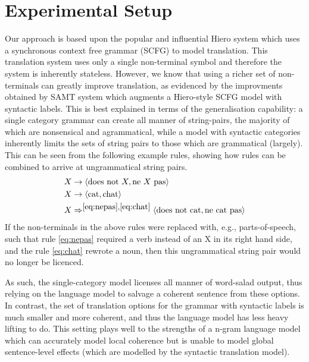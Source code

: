 \chapter{Experimental Setup}

Our approach is based upon the popular and influential Hiero system \cite{chiang07} which uses a synchronous context free grammar (SCFG) to model translation. 
This translation system uses only a single non-terminal symbol and therefore the system is inherently stateless. 
However, we know that using a richer set of non-terminals can greatly improve translation, as evidenced by the improvments obtained by SAMT system \cite{samt} which augments a Hiero-style SCFG model with syntactic labels.
This is best explained in terms of the generalisation capability: a single category grammar can create all manner of string-pairs, the majority of which are nonsensical and agrammatical, while a model with syntactic categories inherently limits the sets of string pairs to those which are grammatical (largely).
This can be seen from the following example rules, showing how rules can be combined to arrive at ungrammatical string pairs.
\begin{align}
X &\rightarrow \langle \mbox{does not}~X, \mbox{ne}~X~\mbox{pas} \rangle \label{eq:nepas}\\
X &\rightarrow \langle \mbox{cat}, \mbox{chat} \rangle \label{eq:chat} \\
X &\Rightarrow^{\ref{eq:nepas},\ref{eq:chat}} \langle \mbox{does not cat}, \mbox{ne cat pas} \rangle
\nonumber
\end{align}
If the non-terminals in the above rules were replaced with, e.g., parts-of-speech, such that rule \ref{eq:nepas} required a verb instead of an X in its right hand side, and the rule \ref{eq:chat} rewrote a noun, then this ungrammatical string pair would no longer be licenced.

As such, the single-category model licenses all manner of word-salad output, thus relying on the language model to salvage a coherent sentence from these options.
In contrast, the set of translation options for the grammar with syntactic labels is much smaller and more coherent, and thus the language model has less heavy lifting to do.
This setting plays well to the strengths of a n-gram language model which can accurately model local coherence but is unable to model global sentence-level effects (which are modelled by the syntactic translation model). 


